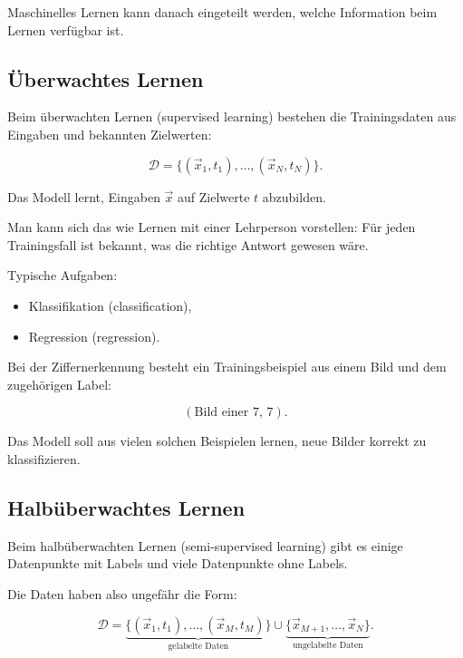 Maschinelles Lernen kann danach eingeteilt werden, welche Information beim Lernen verfügbar ist.

\subsection{Überwachtes Lernen}

\begin{definitionbox}
Beim überwachten Lernen (supervised learning) bestehen die Trainingsdaten aus Eingaben und bekannten Zielwerten:

\[
    \mathcal{D}
    =
    \{(\vec{x}_1,t_1),\dots,(\vec{x}_N,t_N)\}.
\]

Das Modell lernt, Eingaben \(\vec{x}\) auf Zielwerte \(t\) abzubilden.
\end{definitionbox}

Man kann sich das wie Lernen mit einer Lehrperson vorstellen:
Für jeden Trainingsfall ist bekannt, was die richtige Antwort gewesen wäre.

Typische Aufgaben:

\begin{itemize}
    \item Klassifikation (classification),
    \item Regression (regression).
\end{itemize}

\begin{examplebox}
Bei der Ziffernerkennung besteht ein Trainingsbeispiel aus einem Bild und dem zugehörigen Label:

\[
    (\text{Bild einer 7},\,7).
\]

Das Modell soll aus vielen solchen Beispielen lernen, neue Bilder korrekt zu klassifizieren.
\end{examplebox}

\subsection{Halbüberwachtes Lernen}

\begin{definitionbox}
Beim halbüberwachten Lernen (semi-supervised learning) gibt es einige Datenpunkte mit Labels und viele Datenpunkte ohne Labels.
\end{definitionbox}

Die Daten haben also ungefähr die Form:

\[
    \mathcal{D}
    =
    \underbrace{
        \{(\vec{x}_1,t_1),\dots,(\vec{x}_M,t_M)\}
    }_{\text{gelabelte Daten}}
    \cup
    \underbrace{
        \{\vec{x}_{M+1},\dots,\vec{x}_N\}
    }_{\text{ungelabelte Daten}}.
\]

